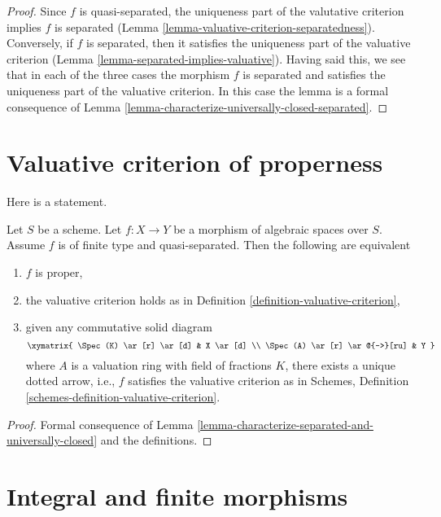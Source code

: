 \begin{proof}
Since $f$ is quasi-separated, the uniqueness
part of the valutative criterion implies $f$ is separated
(Lemma \ref{lemma-valuative-criterion-separatedness}).
Conversely, if $f$ is separated, then it satisfies the
uniqueness part of the valuative criterion
(Lemma \ref{lemma-separated-implies-valuative}).
Having said this, we see that in each of the three cases the
morphism $f$ is separated and satisfies the uniqueness part
of the valuative criterion. In this case the lemma is a formal
consequence of
Lemma \ref{lemma-characterize-universally-closed-separated}.
\end{proof}



\section{Valuative criterion of properness}
\label{section-valuative-criterion-properness}

\noindent
Here is a statement.

\begin{lemma}
\label{lemma-characterize-proper}
Let $S$ be a scheme. Let $f : X \to Y$ be a morphism of algebraic spaces
over $S$. Assume $f$ is of finite type and quasi-separated. Then the
following are equivalent
\begin{enumerate}
\item $f$ is proper,
\item the valuative criterion holds as in Definition
\ref{definition-valuative-criterion},
\item given any commutative solid diagram
$$
\xymatrix{
\Spec(K) \ar[r] \ar[d] & X \ar[d] \\
\Spec(A) \ar[r] \ar@{-->}[ru] & Y
}
$$
where $A$ is a valuation ring with field of fractions $K$, there exists
a unique dotted arrow, i.e., $f$ satisfies the valuative
criterion as in
Schemes, Definition \ref{schemes-definition-valuative-criterion}.
\end{enumerate}
\end{lemma}

\begin{proof}
Formal consequence of
Lemma \ref{lemma-characterize-separated-and-universally-closed}
and the definitions.
\end{proof}





\section{Integral and finite morphisms}
\label{section-integral}

